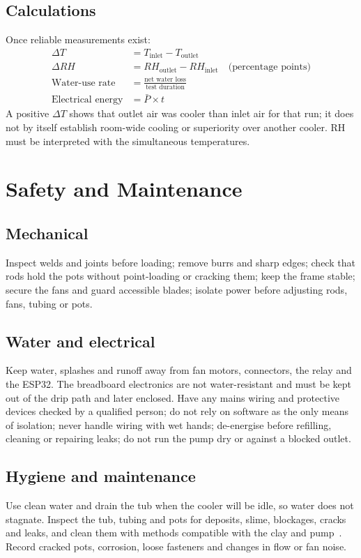 \documentclass[11pt,a4paper]{report}
\begin{document}
\section{Calculations}
Once reliable measurements exist:
\begin{align*}
\Delta T &= T_\text{inlet} - T_\text{outlet} \\
\Delta RH &= RH_\text{outlet} - RH_\text{inlet} \quad \text{(percentage points)}\\
\text{Water-use rate} &= \frac{\text{net water loss}}{\text{test duration}} \\
\text{Electrical energy} &= \bar{P} \times t
\end{align*}
A positive $\Delta T$ shows that outlet air was cooler than inlet air for that run; it does not by itself establish room-wide cooling or superiority over another cooler. RH must be interpreted with the simultaneous temperatures.

\chapter{Safety and Maintenance}

\section{Mechanical}
Inspect welds and joints before loading; remove burrs and sharp edges; check that rods hold the pots without point-loading or cracking them; keep the frame stable; secure the fans and guard accessible blades; isolate power before adjusting rods, fans, tubing or pots.

\section{Water and electrical}
Keep water, splashes and runoff away from fan motors, connectors, the relay and the ESP32. The breadboard electronics are not water-resistant and must be kept out of the drip path and later enclosed. Have any mains wiring and protective devices checked by a qualified person; do not rely on software as the only means of isolation; never handle wiring with wet hands; de-energise before refilling, cleaning or repairing leaks; do not run the pump dry or against a blocked outlet.

\section{Hygiene and maintenance}
Use clean water and drain the tub when the cooler will be idle, so water does not stagnate. Inspect the tub, tubing and pots for deposits, slime, blockages, cracks and leaks, and clean them with methods compatible with the clay and pump~\cite{doe}. Record cracked pots, corrosion, loose fasteners and changes in flow or fan noise.
\end{document}
